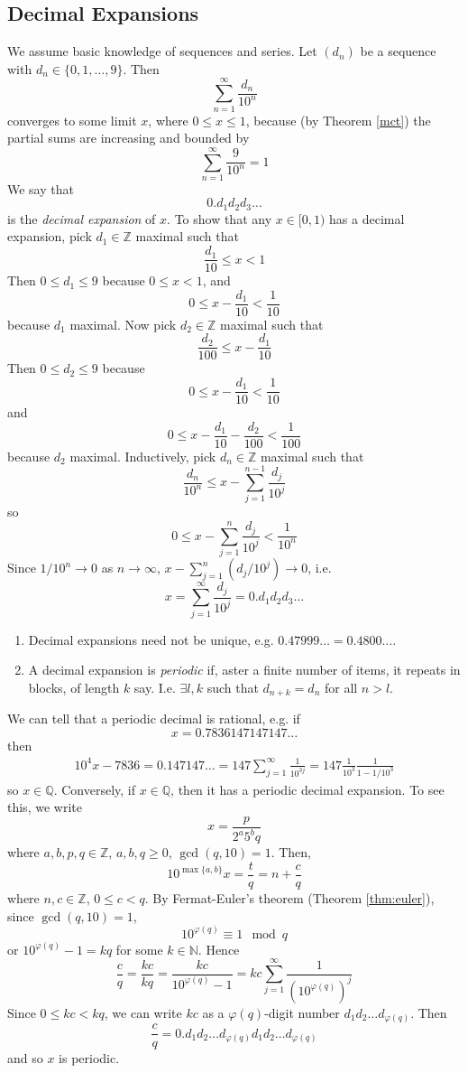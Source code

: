 \documentclass[10pt, a4paper, twoside]{report}
\begin{document}
\subsection{Decimal Expansions}
We assume basic knowledge of sequences and series. Let \((d_n)\) be a sequence with \(d_n\in\{0,1,\ldots,9\}\). Then 
\[\sum_{n=1}^{\infty}\frac{d_n}{10^n}\]
converges to some limit \(x\), where \(0\leq x\leq 1\), because (by Theorem \ref{mct}) the partial sums are increasing and bounded by 
\[\sum_{n=1}^{\infty}\frac{9}{10^n}=1\]
We say that 
\[0.d_1d_2d_3\ldots\]
is the \emph{decimal expansion} of \(x\). To show that any \(x\in[0,1)\) has a decimal expansion, pick \(d_1\in\mathbb{Z}\) maximal such that 
\[\frac {d_1}{10}\leq x<1\]
Then \(0\leq d_1\leq 9\) because \(0\leq x<1\), and 
\[0\leq x-\frac{d_1}{10}<\frac 1{10}\]
because \(d_1\) maximal. Now pick \(d_2\in\mathbb{Z}\) maximal such that 
\[\frac{d_2}{100}\leq x-\frac{d_1}{10}\]
Then \(0\leq d_2\leq 9\) because 
\[0\leq x-\frac{d_1}{10}<\frac 1{10}\]
and 
\[0\leq x-\frac{d_1}{10}-\frac{d_2}{100}<\frac 1{100}\]
because \(d_2\) maximal. Inductively, pick \(d_n\in\mathbb{Z}\) maximal such that 
\[\frac{d_n}{10^n}\leq x-\sum_{j=1}^{n-1}\frac{d_j}{10^j}\]
so 
\[0\leq x-\sum_{j=1}^{n}\frac{d_j}{10^j}<\frac{1}{10^n}\]
Since \(1/10^n\to 0\) as \(n\to\infty\), \(x-\sum_{j=1}^{n}({d_j}/{10^j})\to 0\), i.e. 
\[x=\sum_{j=1}^{\infty}\frac{d_j}{10^j}=0.d_1d_2d_3\ldots\]
\begin{remark} \item[]
    \begin{enumerate}
        \item Decimal expansions need not be unique, e.g. \(0.47999\ldots=0.4800\ldots\).
        \item A decimal expansion is \emph{periodic} if, aster a finite number of items, it repeats in blocks, of length \(k\) say. I.e. \(\exists l,k\) such that \(d_{n+k}=d_n\) for all \(n>l\).
    \end{enumerate}
\end{remark}
We can tell that a periodic decimal is rational, e.g. if 
\[x=0.7836147147147\ldots\]
then 
\begin{align*}
    10^4x-7836=0.147147\ldots
    =147\sum_{j=1}^\infty\frac 1{10^{3j}}
    =147\frac 1{10^3}\frac 1{1-1/10^3}  
\end{align*}
so \(x\in\mathbb{Q}\). Conversely, if \(x\in\mathbb{Q}\), then it has a periodic decimal expansion. To see this, we write 
\[x=\frac p{2^a5^bq}\]
where \(a,b,p,q\in\mathbb{Z}\), \(a,b,q\geq 0\), \(\gcd(q,10)=1\). Then, 
\[10^{\max\{a,b\}}x=\frac tq=n+\frac cq\]
where \(n,c\in\mathbb{Z}\), \(0\leq c<q\). By Fermat-Euler's theorem (Theorem \ref{thm:euler}), since \(\gcd(q,10)=1\), 
\[10^{\varphi(q)}\equiv 1\mod q\]
or \(10^{\varphi(q)}-1=kq\) for some \(k\in\mathbb{N}\). Hence 
\[\frac cq=\frac {kc}{kq}=\frac {kc}{10^{\varphi(q)}-1}=kc\sum_{j=1}^{\infty}\frac 1{(10^{\varphi(q)})^j}\]
Since \(0\leq kc<kq\), we can write \(kc\) as a \(\varphi(q)\)-digit number \(d_1d_2\ldots d_{\varphi(q)}\). Then 
\[\frac cq=0.d_1d_2\ldots d_{\varphi(q)}d_1d_2\ldots d_{\varphi(q)}\]
and so \(x\) is periodic.
\end{document}
